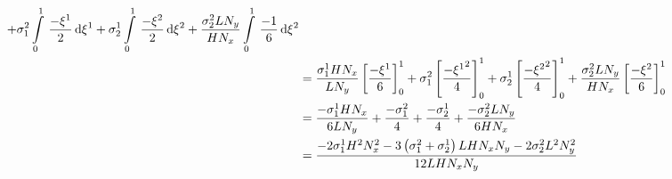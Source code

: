 \begin{equation}
\begin{aligned}
    +\conductivitytensorsymbol^{2}_{1}\gint{0}{1}{\dfrac{-\xione}{2}}{\xione}
    +\conductivitytensorsymbol^{1}_{2}\gint{0}{1}{\dfrac{-\xitwo}{2}}{\xitwo}
    +\dfrac{\conductivitytensorsymbol^{2}_{2} L N_{y}}{H N_{x}}\gint{0}{1}{\dfrac{-1}{6}}{\xitwo} \\
    &=\dfrac{\conductivitytensorsymbol^{1}_{1} H N_{x}}{L N_{y}}\sqbrac{\dfrac{-\xione}{6}}^{1}_{0}
    +\conductivitytensorsymbol^{2}_{1}\sqbrac{\dfrac{-\xionesq}{4}}^{1}_{0}
    +\conductivitytensorsymbol^{1}_{2}\sqbrac{\dfrac{-\xitwosq}{4}}^{1}_{0}
    +\dfrac{\conductivitytensorsymbol^{2}_{2} L N_{y}}{H N_{x}}\sqbrac{\dfrac{-\xitwo}{6}}^{1}_{0} \\
    &=\dfrac{-\conductivitytensorsymbol^{1}_{1} H N_{x}}{6 L N_{y}}+\dfrac{-\conductivitytensorsymbol^{2}_{1}}{4}+
    \dfrac{-\conductivitytensorsymbol^{1}_{2}}{4}+\dfrac{-\conductivitytensorsymbol^{2}_{2} L N_{y}}{6 H N_{x}} \\
    &=\dfrac{-2\conductivitytensorsymbol^{1}_{1}H^{2}N_{x}^{2}-3\pbrac{\conductivitytensorsymbol^{2}_{1}+
        \conductivitytensorsymbol^{1}_{2}}L H N_{x} N_{y}-2\conductivitytensorsymbol^{2}_{2}L^{2}N_{y}^{2}}{12 L H N_{x} N_{y}}
  \end{aligned}
\end{equation}

